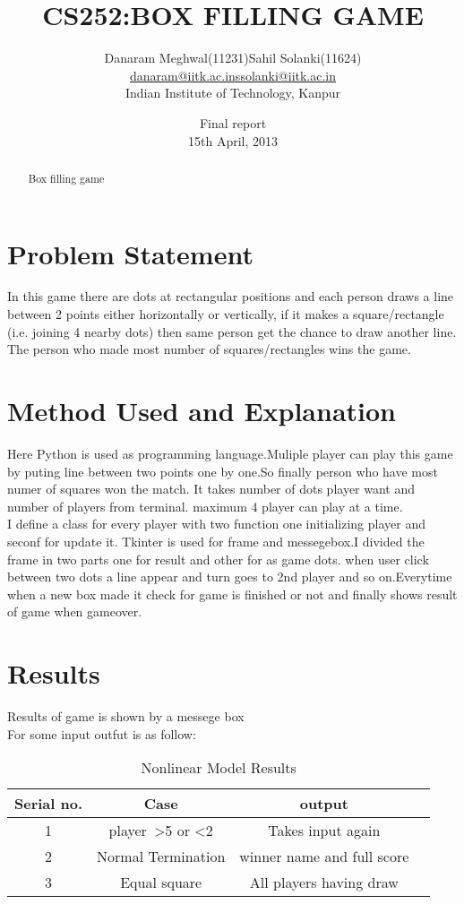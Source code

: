 \documentclass[]{article}
\title{CS252:BOX FILLING GAME}
\author{
\begin{tabular}{cc}
	Danaram Meghwal(11231) & Sahil Solanki(11624) \\
	\url{danaram@iitk.ac.in} & \url{ssolanki@iitk.ac.in} \\
	\multicolumn{2}{c}{Indian Institute of Technology, Kanpur}
\end{tabular}
}
\date{Final report \\	%
15th April, 2013}	%
\begin{document}
\maketitle

\begin{abstract}
	Box filling game
\end{abstract}


\section{Problem Statement}
In this game there are dots at rectangular positions and 
each person draws a line between 2 points either horizontally
or vertically, if it makes a square/rectangle (i.e. joining 4 nearby dots) 
then same person get the chance to draw another line.
The person who made most number of squares/rectangles wins the game.

\section{Method Used and Explanation}
  Here Python is used as programming language.Muliple
player can play this game by puting line between two points
one by one.So finally person who have most numer of squares won the match.
It takes number of dots player want and number of players from terminal. maximum 4 player can play at a time.\\
  I define a class for every player with two function one initializing player and seconf for update it.
Tkinter is used for frame and messegebox.I divided the frame in two parts one for result and other for as game dots.
when user click between two dots a line appear and turn goes to 2nd player and so on.Everytime when
a new box made it check for game is finished or not and finally shows result of game when gameover.

\section{Results}
Results of game is shown by a messege box\\
For some input outfut is as follow:\\
\begin{table}[ht]
\caption{Nonlinear Model Results}
\centering
\begin{tabular}{c c c c}
\hline\hline
Serial no. & Case & output\\ [0.1ex]
\hline
1 & player\ \textgreater 5 or \textless 2  & Takes input again\\
2 & Normal Termination & winner name and full score \\
3 & Equal square & All players having draw \\ [1ex]
\hline
\end{tabular}
\label{table:nonlin}
\end{table}
\end{document}
